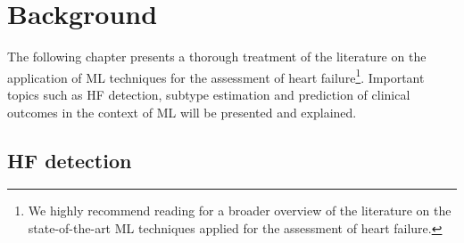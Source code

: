 \documentclass[../thesis.tex]{subfiles}
\begin{document}
\chapter{Background}
\label{chap:back}

The following chapter presents a thorough treatment of the literature on the application of ML techniques for the assessment of heart failure\footnote{We highly recommend reading \cite{tripoliti2017heart} for a broader overview of the literature on the state-of-the-art ML techniques applied for the assessment of heart failure.}. Important topics such as HF detection, subtype estimation and prediction of clinical outcomes in the context of ML will be presented and explained.

\section{HF detection}
\label{sec:hfdet}
\end{document}
